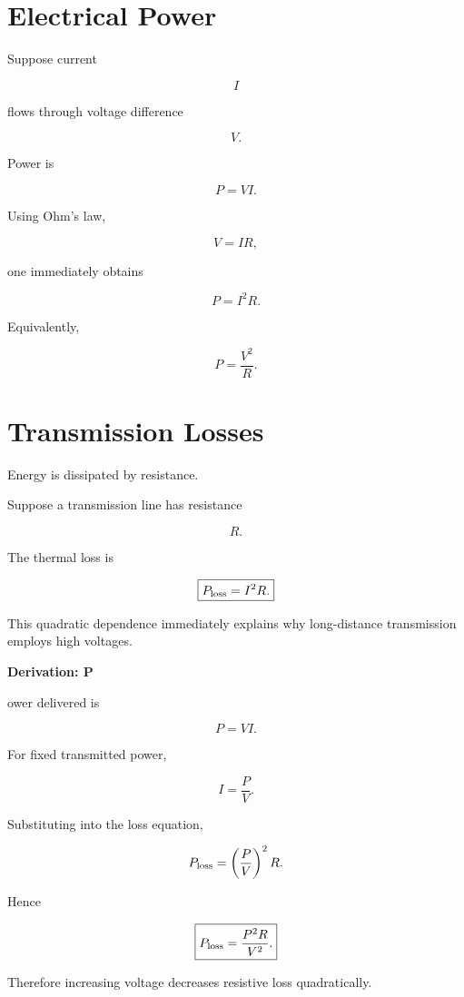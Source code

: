 \documentclass[11pt,fleqn]{book}
\numberwithin{equation}{chapter}
\newenvironment{derivation}[1]
  {\begin{derivationEnv}
   \noindent\textbf{Derivation: #1}\par\smallskip}
  {\end{derivationEnv}}
\theoremstyle{plain}
\theoremstyle{definition}
\theoremstyle{remark}
\begin{document}

\section{Electrical Power}

Suppose current

\[
I
\]

flows through voltage difference

\[
V.
\]

Power is

\[
\boxed{
P=VI.
}
\]

Using Ohm's law,

\[
V=IR,
\]

one immediately obtains

\[
P
=
I^2R.
\]

Equivalently,

\[
P
=
\frac{V^2}{R}.
\]


\section{Transmission Losses}

Energy is dissipated by resistance.

Suppose a transmission line has resistance

\[
R.
\]

The thermal loss is

\[
\boxed{
P_{\rm loss}
=
I^2R.
}
\]

This quadratic dependence immediately explains why long-distance
transmission employs high voltages.


\begin{derivation}

Power delivered is

\[
P
=
VI.
\]

For fixed transmitted power,

\[
I
=
\frac PV.
\]

Substituting into the loss equation,

\[
P_{\rm loss}
=
\left(
\frac PV
\right)^2
R.
\]

Hence

\[
\boxed{
P_{\rm loss}
=
\frac{P^2R}{V^2}.
}
\]

Therefore increasing voltage decreases resistive loss quadratically.

\end{derivation}
\end{document}
